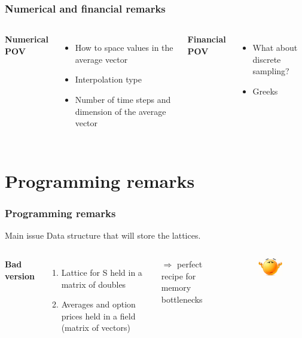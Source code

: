 \documentclass{beamer}
\begin{document}
\begin{frame}
\frametitle{Numerical and financial remarks}
\begin{columns}[t] %

\textbf{Numerical POV}
\begin{itemize}
\item How to space values in the average vector
\item Interpolation type
\item Number of time steps and dimension of the average vector
\end{itemize}

\textbf{Financial POV}
\begin{itemize}
\item What about discrete sampling?
\item Greeks
\end{itemize}

\end{columns}
\end{frame}
\section{Programming remarks}

\begin{frame}
\frametitle{Programming remarks}

\begin{block}{Main issue}
Data structure that will store the lattices.
\end{block}
\vspace{10mm}
\begin{columns}[c] %

\textbf{Bad version}
\begin{enumerate}
\item Lattice for S held in a matrix of doubles
\item Averages and option prices held in a field (matrix of vectors)
\end{enumerate}
\vspace{5mm}
$\Rightarrow$ perfect recipe for memory bottlenecks

\begin{figure}
	\includegraphics[scale=0.8]{no}
\end{figure}

\end{columns}
\end{frame}
\end{document}
